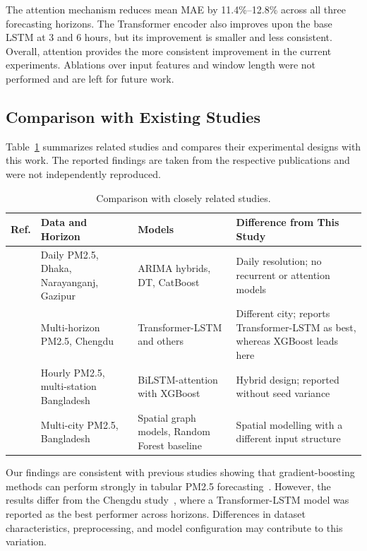 \documentclass[conference]{IEEEtran}
\begin{document}
The attention mechanism reduces mean MAE by 11.4\%--12.8\% across all three forecasting horizons. The Transformer encoder also improves upon the base LSTM at 3 and 6 hours, but its improvement is smaller and less consistent. Overall, attention provides the more consistent improvement in the current experiments. Ablations over input features and window length were not performed and are left for future work.

\subsection{Comparison with Existing Studies}

Table~\ref{tab:compare} summarizes related studies and compares their experimental designs with this work. The reported findings are taken from the respective publications and were not independently reproduced.

\begin{table}[t]
\caption{Comparison with closely related studies.}
\label{tab:compare}
\centering
\footnotesize
\begin{tabular}{p{1.3cm}p{3.4cm}p{3.2cm}p{6.5cm}}
\toprule
Ref. & Data and Horizon & Models & Difference from This Study \\
\midrule

\cite{shahriar2021} &
Daily PM2.5, Dhaka, Narayanganj, Gazipur &
ARIMA hybrids, DT, CatBoost &
Daily resolution; no recurrent or attention models \\

\cite{zeng2026} &
Multi-horizon PM2.5, Chengdu &
Transformer-LSTM and others &
Different city; reports Transformer-LSTM as best, whereas XGBoost leads here \\

\cite{ahmed2026} &
Hourly PM2.5, multi-station Bangladesh &
BiLSTM-attention with XGBoost &
Hybrid design; reported without seed variance \\

\cite{nobin2026} &
Multi-city PM2.5, Bangladesh &
Spatial graph models, Random Forest baseline &
Spatial modelling with a different input structure \\

\bottomrule
\end{tabular}
\end{table}

Our findings are consistent with previous studies showing that gradient-boosting methods can perform strongly in tabular PM2.5 forecasting~\cite{shahriar2021,chen2016}. However, the results differ from the Chengdu study~\cite{zeng2026}, where a Transformer-LSTM model was reported as the best performer across horizons. Differences in dataset characteristics, preprocessing, and model configuration may contribute to this variation.
\end{document}
